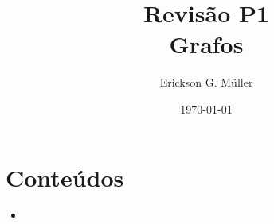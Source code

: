 \documentclass[ ]{article}
\title{Revisão P1\\Grafos}
\author{Erickson G. Müller}
\date{\today}
\begin{document}
\maketitle

\section*{Conteúdos}
	\begin{itemize}
		\item
	\end{itemize}
	
\section{}
\end{document}
